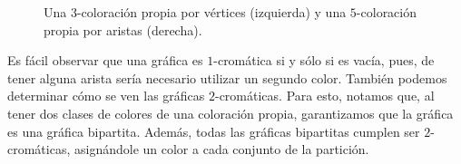 \begin{figure}[ht!]
    \centering
    \caption{Una $3$-coloraci\'on propia por v\'ertices (izquierda) y una
        $5$-coloraci\'on propia por aristas (derecha).}
        \label{fig:ex-color-prop}
\end{figure}

Es f\'acil observar que una gr\'afica es $1$-crom\'atica si y s\'olo si es
vac\'ia, pues, de tener alguna arista ser\'ia necesario utilizar un segundo
color. Tambi\'en podemos determinar c\'omo se ven las gr\'aficas
$2$-crom\'aticas. Para esto, notamos que, al tener dos clases de colores de una
coloraci\'on propia, garantizamos que la gr\'afica es una gr\'afica bipartita.
Adem\'as, todas las gr\'aficas bipartitas cumplen ser $2$-crom\'aticas,
asign\'andole un color a cada conjunto de la partici\'on.

